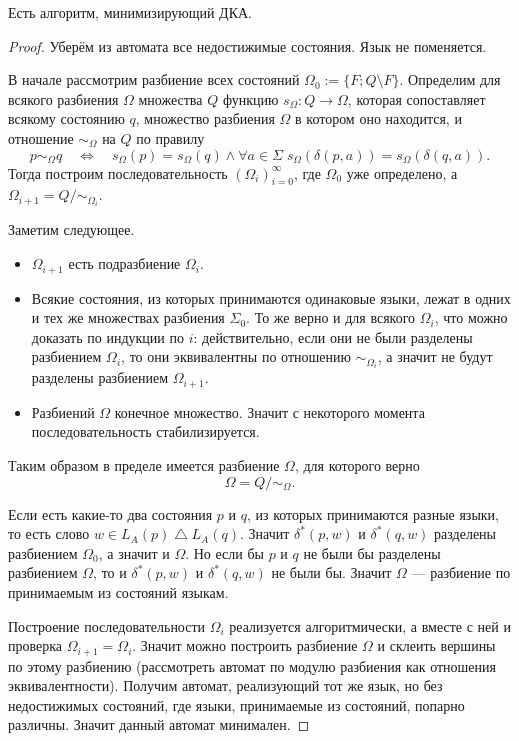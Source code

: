 \documentclass[12pt,a4paper]{article}
\begin{document}
    \begin{theorem}
        Есть алгоритм, минимизирующий ДКА.
    \end{theorem}

    \begin{proof}
        Уберём из автомата все недостижимые состояния. Язык не поменяется.

        В начале рассмотрим разбиение всех состояний $\Omega_0 := \{F; Q \setminus F\}$. Определим для всякого разбиения $\Omega$ множества $Q$ функцию $s_\Omega: Q \to \Omega$, которая сопоставляет всякому состоянию $q$, множество разбиения $\Omega$ в котором оно находится, и отношение $\sim_\Omega$ на $Q$ по правилу
        \[
            p \sim_\Omega q
            \quad \Longleftrightarrow \quad
            s_\Omega(p) = s_\Omega(q) \wedge \forall a \in \Sigma\; s_\Omega(\delta(p, a)) = s_\Omega(\delta(q, a)).
        \]
        Тогда построим последовательность $(\Omega_i)_{i=0}^\infty$, где $\Omega_0$ уже определено, а $\Omega_{i+1} = Q/{\sim}_{\Omega_i}$.

        Заметим следующее.
        \begin{itemize}
            \item $\Omega_{i+1}$ есть подразбиение $\Omega_i$.
            \item Всякие состояния, из которых принимаются одинаковые языки, лежат в одних и тех же множествах разбиения $\Sigma_0$. То же верно и для всякого $\Omega_i$, что можно доказать по индукции по $i$: действительно, если они не были разделены разбиением $\Omega_i$, то они эквивалентны по отношению $\sim_{\Omega_i}$, а значит не будут разделены разбиением $\Omega_{i+1}$.
            \item Разбиений $\Omega$ конечное множество. Значит с некоторого момента последовательность стабилизируется.
        \end{itemize}
        Таким образом в пределе имеется разбиение $\Omega$, для которого верно
        \[\Omega = Q/{\sim}_\Omega.\]

        Если есть какие-то два состояния $p$ и $q$, из которых принимаются разные языки, то есть слово $w \in L_A(p) \bigtriangleup L_A(q)$. Значит $\delta^*(p, w)$ и $\delta^*(q, w)$ разделены разбиением $\Omega_0$, а значит и $\Omega$. Но если бы $p$ и $q$ не были бы разделены разбиением $\Omega$, то и $\delta^*(p, w)$ и $\delta^*(q, w)$ не были бы. Значит $\Omega$ --- разбиение по принимаемым из состояний языкам.

        Построение последовательности $\Omega_i$ реализуется алгоритмически, а вместе с ней и проверка $\Omega_{i+1} = \Omega_i$. Значит можно построить разбиение $\Omega$ и склеить вершины по этому разбиению (рассмотреть автомат по модулю разбиения как отношения эквивалентности). Получим автомат, реализующий тот же язык, но без недостижимых состояний, где языки, принимаемые из состояний, попарно различны. Значит данный автомат минимален.
    \end{proof}
\end{document}
